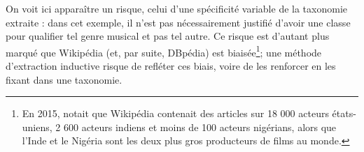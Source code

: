 On voit ici apparaître un risque, celui d'une spécificité variable de la taxonomie extraite : dans cet exemple, il n'est pas nécessairement justifié d'avoir une classe pour qualifier tel genre musical et pas tel autre. 
Ce risque est d'autant plus marqué que Wikipédia (et, par suite, DBpédia) est biaisée\footnote{En 2015, \cite{nickel2015review} notait que Wikipédia contenait des articles sur 18 000 acteurs états-uniens, 2 600 acteurs indiens et moins de 100 acteurs nigérians, alors que l'Inde et le Nigéria sont les deux plus gros producteurs de films au monde.}; une méthode d'extraction inductive risque de refléter ces biais, voire de les renforcer en les fixant dans une taxonomie.



